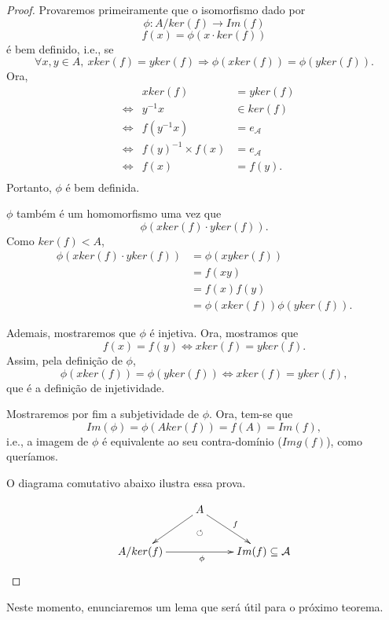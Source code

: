 \documentclass[11pt,openany]{book}
\begin{document}
 \begin{proof}
     Provaremos primeiramente que o isomorfismo dado por
    \[\phi:A/ker(f) \rightarrow Im(f)\]
    \[f(x) = \phi(x \cdot ker(f))\] é bem definido, i.e., se
    \[\forall x,y \in A, \ xker(f) = yker(f) \Rightarrow \phi(xker(f)) = \phi(yker(f)).\]
    Ora,
    \begin{align*}
        &&x ker(f) &= y ker(f)\\
        &\Leftrightarrow &y^{-1}x &\in ker(f)\\
        &\Leftrightarrow &f(y^{-1}x) &= e_\mathcal{A}\\
        &\Leftrightarrow &f(y)^{-1} \times f(x) &= e_\mathcal{A}\\
        &\Leftrightarrow &f(x) &= f(y).\\
    \end{align*}
    Portanto, $\phi$ é bem definida.

    $\phi$ também é um homomorfismo uma vez que
    \[\phi(x ker(f) \cdot y ker(f)).\]
    Como $ker(f) < A$,
    \begin{align*}
        \phi(x ker(f) \cdot y ker(f)) &= \phi(xy ker(f))\\
        &= f(xy) \\
        &= f(x)f(y) \\
        &= \phi(x ker(f)) \phi(y ker(f)).
    \end{align*}
    
    Ademais, mostraremos que $\phi$ é injetiva. Ora, mostramos que
    \[f(x) = f(y) \Leftrightarrow x ker(f) = y ker(f).\]
    Assim, pela definição de $\phi$,
    \[\phi(x ker(f)) = \phi(y ker(f)) \Leftrightarrow x ker(f) = y ker(f),\]
    que é a definição de injetividade.

    Mostraremos por fim a subjetividade de $\phi$. Ora, tem-se que
    \[Im(\phi) = \phi(A ker(f)) = f(A) = Im(f),\]
    i.e., a imagem de $\phi$ é equivalente ao seu contra-domínio ($Img(f)$), como queríamos.

    O diagrama comutativo abaixo ilustra essa prova.
    
    \[\xymatrix{ & A \ar[dl]_{} \ar[dr]^{f} \ar@{}[d]|-{\circlearrowleft} \\ A/ker(f) \ar[rr]_{\phi} && Im(f) \subseteq\mathcal{A}
}\]
 \end{proof}
 
    Neste momento, enunciaremos um lema que será útil para o próximo teorema.
    
\end{document}
